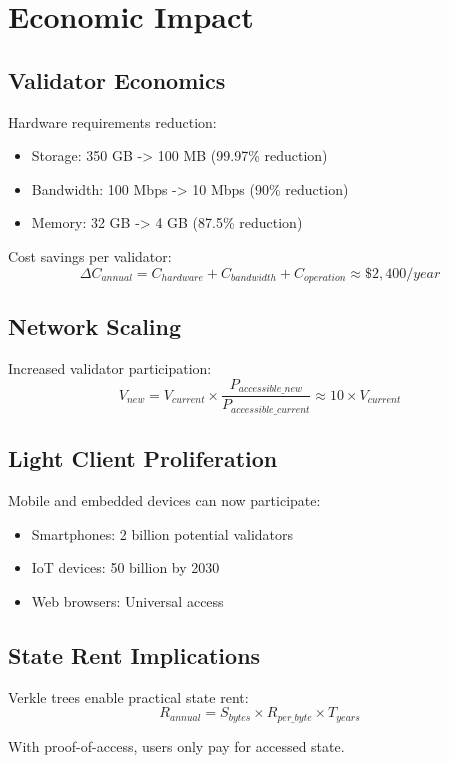 \section{Economic Impact}


\subsection{Validator Economics}

Hardware requirements reduction:
\begin{itemize}
    \item Storage: 350 GB -> 100 MB (99.97\% reduction)
    \item Bandwidth: 100 Mbps -> 10 Mbps (90\% reduction)
    \item Memory: 32 GB -> 4 GB (87.5\% reduction)
\end{itemize}

Cost savings per validator:
\begin{equation}
    \Delta C_{annual} = C_{hardware} + C_{bandwidth} + C_{operation} \approx \$2,400/year
\end{equation}

\subsection{Network Scaling}

Increased validator participation:
\begin{equation}
    V_{new} = V_{current} \times \frac{P_{accessible\_new}}{P_{accessible\_current}} \approx 10 \times V_{current}
\end{equation}

\subsection{Light Client Proliferation}

Mobile and embedded devices can now participate:
\begin{itemize}
    \item Smartphones: 2 billion potential validators
    \item IoT devices: 50 billion by 2030
    \item Web browsers: Universal access
\end{itemize}

\subsection{State Rent Implications}

Verkle trees enable practical state rent:
\begin{equation}
    R_{annual} = S_{bytes} \times R_{per\_byte} \times T_{years}
\end{equation}

With proof-of-access, users only pay for accessed state.

